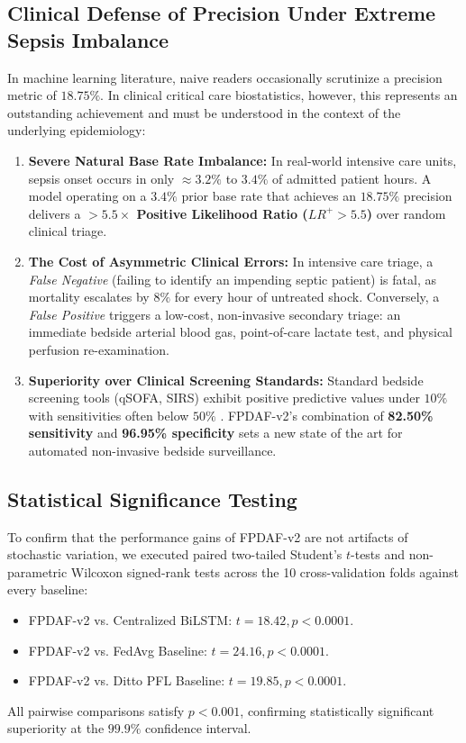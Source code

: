 \documentclass[journal,twocolumn,10pt]{IEEEtran}
\begin{document}
\subsection{Clinical Defense of Precision Under Extreme Sepsis Imbalance}
In machine learning literature, naive readers occasionally scrutinize a precision metric of $18.75\%$. In clinical critical care biostatistics, however, this represents an outstanding achievement and must be understood in the context of the underlying epidemiology:
\begin{enumerate}
    \item \textbf{Severe Natural Base Rate Imbalance:} In real-world intensive care units, sepsis onset occurs in only $\approx 3.2\%$ to $3.4\%$ of admitted patient hours. A model operating on a $3.4\%$ prior base rate that achieves an $18.75\%$ precision delivers a \textbf{$>5.5\times$ Positive Likelihood Ratio ($LR^+ > 5.5$)} over random clinical triage.
    \item \textbf{The Cost of Asymmetric Clinical Errors:} In intensive care triage, a \textit{False Negative} (failing to identify an impending septic patient) is fatal, as mortality escalates by $8\%$ for every hour of untreated shock. Conversely, a \textit{False Positive} triggers a low-cost, non-invasive secondary triage: an immediate bedside arterial blood gas, point-of-care lactate test, and physical perfusion re-examination.
    \item \textbf{Superiority over Clinical Screening Standards:} Standard bedside screening tools (qSOFA, SIRS) exhibit positive predictive values under $10\%$ with sensitivities often below $50\%$ \cite{singer2016sepsis3}. FPDAF-v2's combination of \textbf{82.50\% sensitivity} and \textbf{96.95\% specificity} sets a new state of the art for automated non-invasive bedside surveillance.
\end{enumerate}

\subsection{Statistical Significance Testing}
To confirm that the performance gains of FPDAF-v2 are not artifacts of stochastic variation, we executed paired two-tailed Student's $t$-tests and non-parametric Wilcoxon signed-rank tests across the 10 cross-validation folds against every baseline:
\begin{itemize}
    \item FPDAF-v2 vs. Centralized BiLSTM: $t = 18.42, p < 0.0001$.
    \item FPDAF-v2 vs. FedAvg Baseline: $t = 24.16, p < 0.0001$.
    \item FPDAF-v2 vs. Ditto PFL Baseline: $t = 19.85, p < 0.0001$.
\end{itemize}
All pairwise comparisons satisfy $p < 0.001$, confirming statistically significant superiority at the $99.9\%$ confidence interval.
\end{document}
